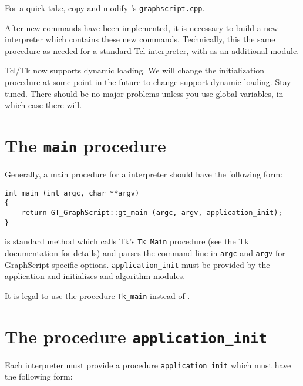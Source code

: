\documentclass[twoside,fleqn]{report}
\begin{document}
For a quick take, copy and modify \Graphlet{}'s \texttt{graphscript.cpp}.

After new \GraphScript{} commands have been implemented, it is
necessary to build a new interpreter which contains these new
commands. Technically, this the same procedure as needed for a
standard Tcl interpreter, with \GraphScript{} as an additional
module. 

\begin{note}
  Tcl/Tk now supports dynamic loading.  We will change the 
  initialization procedure at some point in the future to change 
  support dynamic loading.  Stay tuned.  There should be no major 
  problems unless you use global variables, in which case there will.
\end{note}

%
%
%

\section{The \texttt{main} procedure}

Generally, a main procedure for a \GraphScript{} interpreter should 
have the following form:

\begin{verbatim}
int main (int argc, char **argv) 
{
    return GT_GraphScript::gt_main (argc, argv, application_init);    
}
\end{verbatim}

 is standard method which calls Tk's
\texttt{Tk\_Main} procedure (see the Tk documentation for
details) and parses the command line in \texttt{argc} and
\texttt{argv} for GraphScript specific options.
\texttt{application\_init} must be provided by the application
and initializes \GraphScript{} and algorithm modules.

\begin{notes}
  \item It is legal to use the procedure \texttt{Tk\_main}
  instead of .
\end{notes}
%
%
%

\section{The procedure \texttt{application\_init}}

Each interpreter must provide a procedure \texttt{application\_init} 
which must have the following form:
\end{document}
